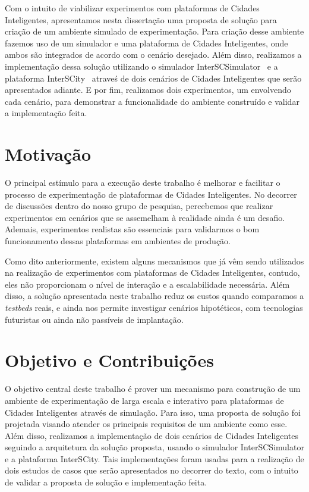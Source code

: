 Com o intuito de viabilizar experimentos com plataformas de Cidades Inteligentes, apresentamos nesta dissertação uma proposta de solução para criação de um ambiente simulado de experimentação.
Para criação desse ambiente fazemos uso de um simulador e uma plataforma de Cidades Inteligentes, onde ambos são integrados de acordo com o cenário desejado.
Além disso, realizamos a implementação dessa solução utilizando o simulador InterSCSimulator~\cite{santana_17} e a plataforma InterSCity~\cite{arthur_17} atraveś de dois cenários de Cidades Inteligentes
que serão apresentados adiante.
E por fim, realizamos dois experimentos, um envolvendo cada cenário, para demonstrar a funcionalidade do ambiente construído e validar a implementação feita.

\section{Motivação}

O principal estímulo para a execução deste trabalho é melhorar e facilitar o processo de experimentação de plataformas de Cidades Inteligentes.
No decorrer de discussões dentro do nosso grupo de pesquisa, percebemos que realizar experimentos em cenários que se assemelham à realidade ainda é um desafio.
Ademais, experimentos realistas são essenciais para validarmos o bom funcionamento dessas plataformas em ambientes de produção.

Como dito anteriormente, existem alguns mecanismos que já vêm sendo utilizados na realização de experimentos com plataformas de Cidades Inteligentes, contudo, eles não proporcionam o nível de interação
e a escalabilidade necessária.
Além disso, a solução apresentada neste trabalho reduz os custos quando comparamos a \textit{testbeds} reais, e ainda nos permite investigar cenários hipotéticos, com tecnologias futuristas ou ainda não
passíveis de implantação.

\section{Objetivo e Contribuições}

O objetivo central deste trabalho é prover um mecanismo para construção de um ambiente de experimentação de larga escala e interativo para plataformas de Cidades Inteligentes através de simulação.
Para isso, uma proposta de solução foi projetada visando atender os principais requisitos de um ambiente como esse.
Além disso, realizamos a implementação de dois cenários de Cidades Inteligentes seguindo a arquitetura da solução proposta, usando o simulador InterSCSimulator e a plataforma InterSCity.
Tais implementações foram usadas para a realização de dois estudos de casos que serão apresentados no decorrer do texto, com o intuito de validar a proposta de solução e implementação feita.

